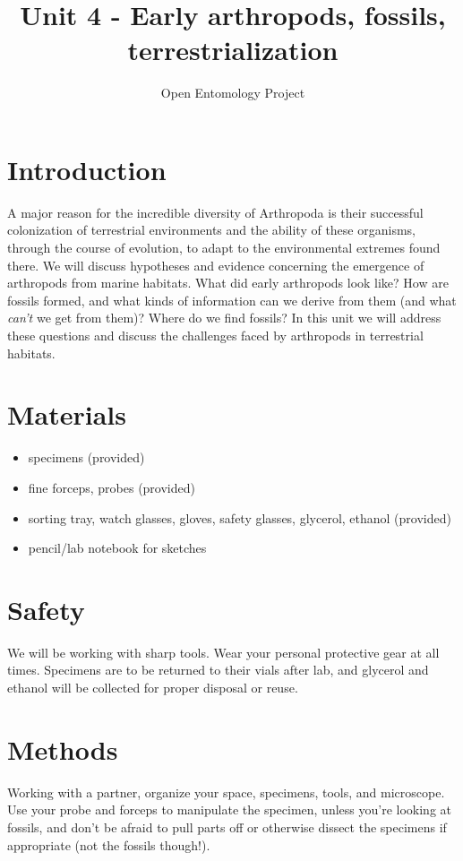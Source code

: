 \documentclass[letterpaper, 11pt]{article}
\title{Unit 4 - Early arthropods, fossils, terrestrialization}
\author{Open Entomology Project}
\begin{document}
\cleanlookdateon %
\maketitle
\thispagestyle{fancy}

\section*{Introduction}
A major reason for the incredible diversity of Arthropoda is their successful colonization of terrestrial environments and the ability of these organisms, through the course of evolution, to adapt to the environmental extremes found there. We will discuss hypotheses and evidence concerning the emergence of arthropods from marine habitats. What did early arthropods look like? How are fossils formed, and what kinds of information can we derive from them (and what \textit{can't} we get from them)? Where do we find fossils? In this unit we will address these questions and discuss the challenges faced by arthropods in terrestrial habitats.

\section*{Materials}

\begin{itemize}
\item specimens (provided)
\item fine forceps, probes (provided)
\item sorting tray, watch glasses, gloves, safety glasses, glycerol, ethanol (provided)
\item pencil/lab notebook for sketches
\end{itemize}

\section*{Safety}
We will be working with sharp tools. Wear your personal protective gear at all times. Specimens are to be returned to their vials after lab, and glycerol and ethanol will be collected for proper disposal or reuse.

\section*{Methods}
Working with a partner, organize your space, specimens, tools, and microscope. Use your probe and forceps to manipulate the specimen, unless you're looking at fossils, and don't be afraid to pull parts off or otherwise dissect the specimens if appropriate (not the fossils though!).
\end{document}
